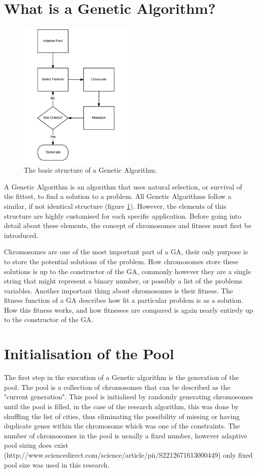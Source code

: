 \section{What is a Genetic Algorithm?}
\par
\begin{figure}[h]
	\centering
		\includegraphics[width=0.5\textwidth]{GA_Structure}
	\caption{The basic structure of a Genetic Algorithm.}
	\label{struct}
\end{figure}
\noindent
A Genetic Algorithm is an algorithm that uses natural selection, or survival of the fittest, to find a solution to a problem. All Genetic Algorithms follow a similar, if not identical structure (figure \ref{struct}). However, the elements of this structure are highly customised for each specific application. Before going into detail about these elements, the concept of chromosomes and fitness must first be introduced.
\par
Chromosomes are one of the most important part of a GA, their only purpose is to store the potential solutions of the problem. How chromosomes store these solutions is up to the constructor of the GA, commonly however they are a single string that might represent a binary number, or possibly a list of the problems variables. Another important thing about chromosomes is their fitness. The fitness function of a GA describes how fit a particular problem is as a solution. How this fitness works, and how fitnesses are compared is again nearly entirely up to the constructor of the GA.


\section{Initialisation of the Pool}
\par
The first step in the execution of a Genetic algorithm is the generation of the pool. The pool is a collection of chromosomes that can be described as the "current generation". This pool is initialised by randomly generating chromosomes until the pool is filled, in the case of the research algorithm, this was done by shuffling the list of cities, thus eliminating the possibility of missing or having duplicate genes within the chromosome which was one of the constraints. The number of chromosomes in the pool is usually a fixed number, however adaptive pool sizing does exist (http://www.sciencedirect.com/science/article/pii/S2212671613000449) only fixed pool size was used in this research. 
